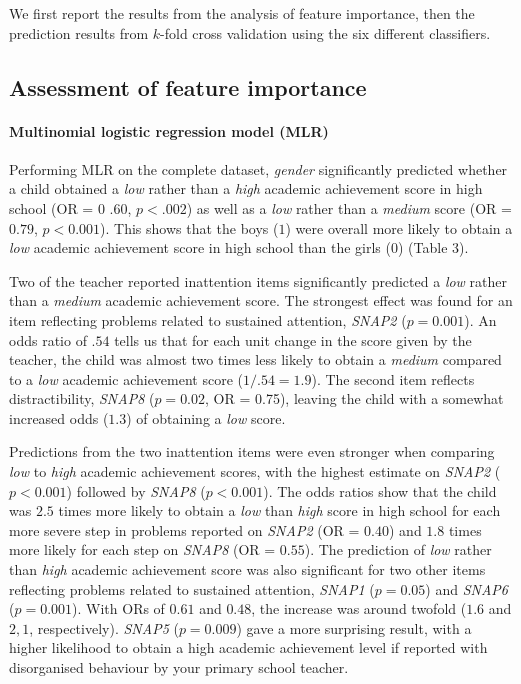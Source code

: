 \documentclass[10pt,letterpaper]{article}
\begin{document}
{{We first report the results from the analysis of feature importance, then the prediction results from $k$-fold cross validation using the six different classifiers.

\subsection*{Assessment of feature importance} 


\paragraph{Multinomial logistic regression model (MLR)}


Performing MLR on the complete dataset, {\it gender} significantly predicted whether a child obtained a {\it low} rather than a {\it high} academic achievement score in high school (OR = 0 .60, $p < .002$) as well as a {\it low} rather than a {\it medium} score (OR = $0.79$, $p < 0.001$). This shows that the boys ($1$) were overall more likely to obtain a {\it low} academic achievement score in high school than the girls ($0$) (Table 3). 

Two of the teacher reported inattention items significantly predicted a {\it low} rather than a {\it medium} academic achievement score. The strongest effect was found for an item reflecting problems related to sustained attention, {\it SNAP2} ($p = 0.001$). An odds ratio of $.54$ tells us that for each unit change in the score given by the teacher, the child was almost two times less likely to obtain a {\it medium} compared to a {\it low} academic achievement score ($1/.54 = 1.9$). The second item reflects distractibility, {\it SNAP8} ($p = 0.02$, OR = 0.75), leaving the child with a somewhat increased odds ($1.3$) of obtaining a {\it low} score.  


Predictions from the two inattention items were even stronger when comparing {\it low} to {\it high} academic achievement scores, with the highest estimate on {\it SNAP2} ($p < 0.001$) 
followed by {\it SNAP8} ($p < 0.001$).  The odds ratios show that the child was $2.5$ times more likely to obtain a {\it low} than {\it high} score in high school for each more severe step in problems reported on {\it SNAP2} (OR = $0.40$) and  $1.8$ times more likely for each step on {\it SNAP8} (OR = $0.55$).  
The prediction of {\it low} rather than {\it high} academic achievement score was also significant for two other items reflecting problems related to sustained attention, {\it SNAP1} ($p = 0.05$) and {\it SNAP6} ($p = 0.001$). { With ORs of $0.61$ and $0.48$, the increase was around twofold ($1.6$ and $2,1$, respectively). \it SNAP5} ($p = 0.009$) gave a more surprising result, with a higher likelihood to obtain a high academic achievement level if reported with disorganised behaviour by your primary school teacher.\\

}}
\end{document}
